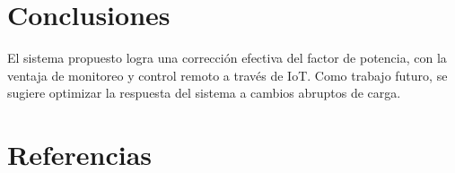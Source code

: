 \documentclass{report}          %
\begin{document}
    \chapter{Conclusiones}
        El sistema propuesto logra una corrección efectiva del factor de potencia, con la ventaja de monitoreo y control remoto a través de IoT. Como trabajo futuro, se sugiere optimizar la respuesta del sistema a cambios abruptos de carga.

    \chapter{Referencias}
\end{document}
